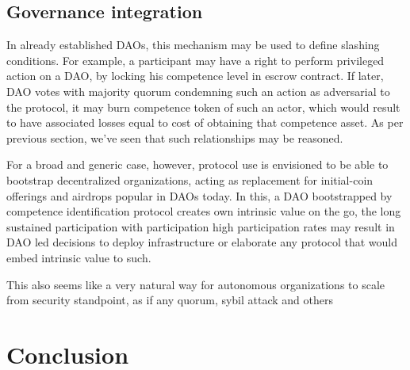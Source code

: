 \documentclass{article}
\begin{document}
\begin{CJK}{UTF8}{gbsn}
\begin{multicols}{2}
        \subsection{Governance integration}
        In already established DAOs, this mechanism may be used to define slashing conditions. For example, a participant may have a right to perform privileged action on a DAO, by locking his competence level in escrow contract. If later, DAO votes with majority quorum condemning such an action as adversarial to the protocol, it may burn competence token of such an actor, which would result to have associated losses equal to cost of obtaining that competence asset. As per previous section, we've seen that such relationships may be reasoned.

        For a broad and generic case, however, protocol use is envisioned to be able to bootstrap decentralized organizations, acting as replacement for initial-coin offerings \cite{Alshater22} and airdrops popular in DAOs today. In this, a DAO bootstrapped by competence identification protocol creates own intrinsic value on the go, the long sustained participation with participation high participation rates may result in DAO led decisions to deploy infrastructure or elaborate any protocol that would embed intrinsic value to such.

        This also seems like a very natural way for autonomous organizations to scale from security standpoint, as if any quorum, sybil attack and others



        \section{Conclusion}


\end{multicols}
\end{CJK}
\end{document}
